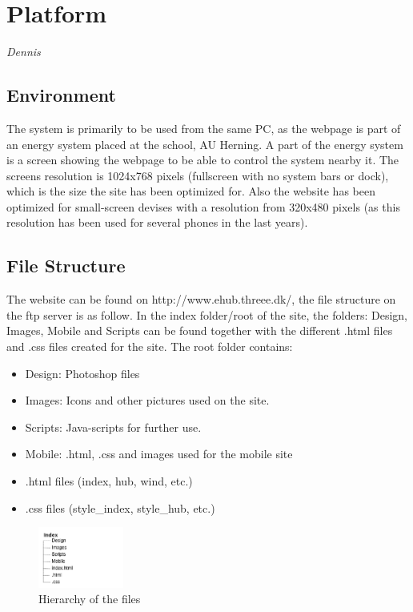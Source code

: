 \newpage
\chapter{Platform} \textit{Dennis}
\section{Environment}
The system is primarily to be used from the same PC, as the webpage is part of an energy system
placed at the school, AU Herning. A part of the energy system is a screen showing the webpage to
be able to control the system nearby it. The screens resolution is 1024x768 pixels (fullscreen with no system bars or dock), 
which is the size the site has been optimized for. Also the website has been optimized for small-screen devises with a resolution from 320x480 pixels (as this resolution has been used for several phones in the last years).
\section{File Structure}
The website can be found on http://www.ehub.threee.dk/, the file structure on the ftp server is as follow. In the index folder/root of the site, the folders: Design, Images, Mobile and Scripts can be found together with the different .html files and .css files created for the site. The root folder contains:
\begin{itemize}
	\item Design: Photoshop files
	\item Images: Icons and other pictures used on the site.
	\item Scripts: Java-scripts for further use.
	\item Mobile: .html, .css and images used for the mobile site
	\item .html files (index, hub, wind, etc.)
	\item .css files (style\_index, style\_hub, etc.)
\end{itemize}
\begin{figure}[htbp]
	\center
	\includegraphics[width=0.25\textwidth]{images/hierarki.png} %
   	\caption{Hierarchy of the files}
   	\label{fig:file_hierarki}
\end{figure}
\newpage
